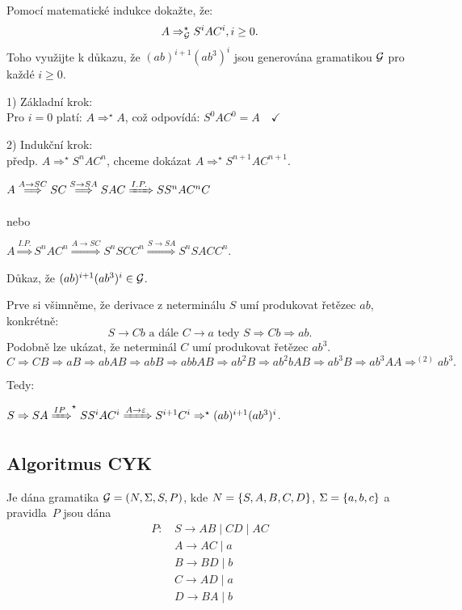 Pomocí matematické indukce dokažte, že:
\[
A \Rightarrow_{\mathcal{G}}^{\star} S^i A C^i, i \geq 0 \text{.}
\]
 Toho využijte k důkazu, že $(ab)^{i+1}(ab^3)^i$ jsou generována gramatikou $\mathcal{G}$ pro
každé $i \geq 0$.

1) Základní krok:\\
Pro $i = 0$ platí: $A {\Longrightarrow^\star} A$, což odpovídá: $S^0 A C^0 = A \quad \checkmark$

2) Indukční krok:\\
předp. $A {\Rightarrow^\star} S^n A C^n$, chceme dokázat $A \Rightarrow^{\star} S^{n+1} A C^{n+1}$.

$A \stackrel{A \rightarrow SC}{\Longrightarrow} SC \stackrel{S \rightarrow SA}{\Longrightarrow} SAC \xRightarrow{I.P.} SS^nAC^nC$

nebo

$A \stackrel{I.P.}{\Longrightarrow} S^n A C^n \stackrel{A \rightarrow SC}{\Longrightarrow} S^nSCC^n \stackrel
{S \rightarrow SA}{\Longrightarrow} S^nSACC^n$.

Důkaz, že $(ab)^{i+1}(ab^3)^i \in \mathcal{G}$.

Prve si všimněme, že derivace z neterminálu $S$ umí produkovat řetězec $ab$, konkrétně:
\[ S \rightarrow Cb \text{ a dále } C \rightarrow a \text{ tedy } S \Rightarrow Cb \Rightarrow ab \text{.}\]
Podobně lze ukázat, že neterminál $C$ umí produkovat řetězec $ab^3$.
\[C \Rightarrow CB \Rightarrow aB \Rightarrow abAB \Rightarrow abB \Rightarrow abbAB \Rightarrow ab^2B 
\Rightarrow ab^2bAB \Rightarrow ab^3B \Rightarrow ab^3 AA \Rightarrow^{(2)} ab^3 \text{.}\]

Tedy:

$S \Rightarrow SA \xRightarrow{IP}^\star S S^i A C^i \xRightarrow{A \rightarrow \varepsilon} S^{i+1} C^i 
\Rightarrow^\star (ab)^{i+1} (ab^3)^i$.

\newpage
\subsection{Algoritmus CYK} %
Je dána gramatika $\mathcal{G} = (N, \Sigma, S, P )$, kde $N = \left\lbrace S, A, B, C, D \right\rbrace$, $\Sigma = \left\lbrace a, b, c \right\rbrace$ a
pravidla~$P$ jsou dána
\begin{align*}
    P \text{: } & S \rightarrow AB \mid CD \mid AC\\
    & A \rightarrow AC \mid a \\
    & B \rightarrow BD \mid b \\
    & C \rightarrow AD \mid a \\
    & D \rightarrow BA \mid b \\
\end{align*}

